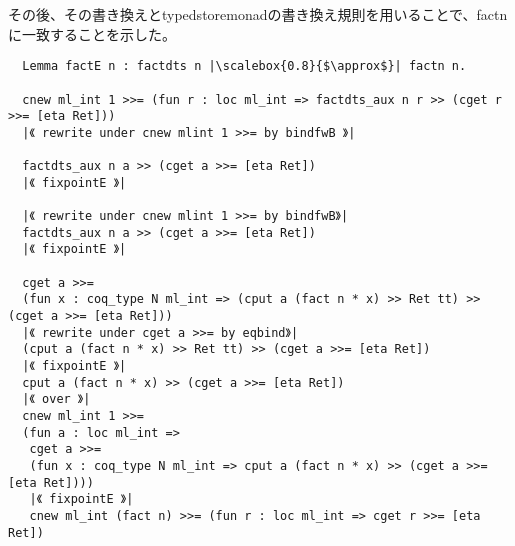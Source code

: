 \documentclass[japanese]{jssst_ppl}
\theoremstyle{definition}
\begin{document}
\iffalse
  \begin{verbatim}
 Definition factn_aux (n: nat) (r : loc ml_int) :=
 do s <- cget r;
 do _ <- cput r (fact n * s); @ret M _ tt.
 
 Lemma factE_aux (n: nat) (r : loc ml_int): factdts_aux n r |\scalebox{0.8}{$\approx$}| factn_aux n r.
 
 | case : (n = 0) |
 while (factdts_aux_body r) 0
 |《 fixpointE 》|
 cget r >>=
 (fun x : coq_type N ml_int =>
  (cput r x >> Ret (inl tt)) >>=
  sum_rect (fun=> M unit) Ret (while (factdts_aux_body r)))
  |《 rewrite under cget r >>= by bindfwB》|
  (cput r s >> Ret (inl tt)) >>= sum_rect (fun=> M unit) Ret (while (factdts_aux_body r))
  |《 fixpointE 》|
  cput r (1 * s) >> Ret tt
  |《 over 》|
  cget r >>= (fun s : coq_type N ml_int => cput r (1 * s) >> Ret tt)

 | case : (n = n' + 1) |
 while (factdts_aux_body r) n'.+1
 |《 fixpointE 》|
 cget r >>=
 (fun x : coq_type N ml_int =>
  (cput r (n'.+1 * x) >> Ret (inr n')) >>=
  sum_rect (fun=> M unit) Ret (while (factdts_aux_body r)))
  |《 rewrite under cget r >>= by bindfwB 》|
  (cput r (n'.+1 * a) >> Ret (inr n')) >>=
  sum_rect (fun=> M unit) Ret (while (factdts_aux_body r))
  |《 fixpointE 》|
  cput r (n'.+1 * a) >> (cget r >>= (fun s : coq_type N ml_int => cput r (fact n' * s) >> Ret tt))
  |《 fixpointE 》|
  cput r (n'.+1 * fact n' * a) >> Ret tt
  |《 over 》|
  cget r >>= (fun s : coq_type N ml_int => cput r (n'.+1 * fact n' * s) >> Ret tt)
 \end{verbatim}

\fi

\iffalse
  その後、その書き換えとtypedstoremonadの書き換え規則を用いることで、factnに一致することを示した。

  \begin{verbatim}
  Lemma factE n : factdts n |\scalebox{0.8}{$\approx$}| factn n.

  cnew ml_int 1 >>= (fun r : loc ml_int => factdts_aux n r >> (cget r >>= [eta Ret]))
  |《 rewrite under cnew mlint 1 >>= by bindfwB 》|

  factdts_aux n a >> (cget a >>= [eta Ret])
  |《 fixpointE 》|

  |《 rewrite under cnew mlint 1 >>= by bindfwB》|
  factdts_aux n a >> (cget a >>= [eta Ret])
  |《 fixpointE 》|

  cget a >>=
  (fun x : coq_type N ml_int => (cput a (fact n * x) >> Ret tt) >> (cget a >>= [eta Ret]))
  |《 rewrite under cget a >>= by eqbind》|
  (cput a (fact n * x) >> Ret tt) >> (cget a >>= [eta Ret])
  |《 fixpointE 》|
  cput a (fact n * x) >> (cget a >>= [eta Ret])
  |《 over 》|
  cnew ml_int 1 >>=
  (fun a : loc ml_int =>
   cget a >>=
   (fun x : coq_type N ml_int => cput a (fact n * x) >> (cget a >>= [eta Ret])))
   |《 fixpointE 》|
   cnew ml_int (fact n) >>= (fun r : loc ml_int => cget r >>= [eta Ret])

\end{verbatim}
\end{document}
